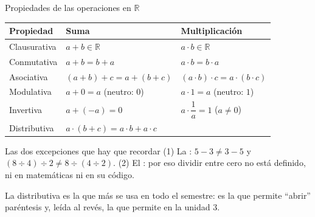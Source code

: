 \documentclass[aspectratio=169,10pt]{beamer}
\begin{document}
\begin{frame}{Propiedades de las operaciones en $\mathbb{R}$}
  \tiny
  \begin{center}
  \begin{tabular}{@{}p{2.3cm}p{4.2cm}p{4.6cm}@{}}
    \toprule
    \textbf{Propiedad} & \textbf{Suma} & \textbf{Multiplicación} \\
    \midrule
    Clausurativa & $a+b \in \mathbb{R}$ & $a\cdot b \in \mathbb{R}$ \\
    Conmutativa  & $a+b = b+a$ & $a\cdot b = b\cdot a$ \\
    Asociativa   & $(a+b)+c = a+(b+c)$ & $(a\cdot b)\cdot c = a\cdot(b\cdot c)$ \\
    Modulativa   & $a+0 = a$ \quad (neutro: $0$) &
      $a\cdot 1 = a$ \quad (neutro: $1$) \\
    Invertiva    & $a+(-a) = 0$ &
      $a\cdot \dfrac{1}{a} = 1$ \quad ($a \neq 0$) \\
    \addlinespace
    Distributiva & \multicolumn{2}{l}{$a\cdot(b+c) = a\cdot b + a\cdot c$} \\
    \bottomrule
  \end{tabular}
  \end{center}

  \vspace{0.1cm}
  \begin{alertblock}{Las dos excepciones que hay que recordar}
    \tiny
    (1) La :
    $5-3 \neq 3-5$ y $(8\div4)\div2 \neq 8\div(4\div2)$. \quad
    (2) El : por eso dividir
    entre cero no está definido, ni en matemáticas ni en su código.
  \end{alertblock}

  \vspace{0.05cm}
  {\tiny\color{uniGris} La distributiva es la que más se usa en todo el
  semestre: es la que permite ``abrir'' paréntesis y, leída al revés, la que
  permite  en la unidad 3.}
\end{frame}
\end{document}

